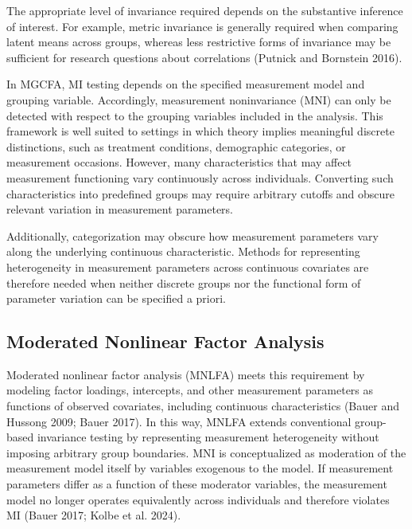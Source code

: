 \documentclass[
  man,
  floatsintext]{apa7}
\begin{document}
The appropriate level of invariance required depends on the substantive
inference of interest. For example, metric invariance is generally
required when comparing latent means across groups, whereas less
restrictive forms of invariance may be sufficient for research questions
about correlations (Putnick and Bornstein 2016).

In MGCFA, MI testing depends on the specified measurement model and
grouping variable. Accordingly, measurement noninvariance (MNI) can only
be detected with respect to the grouping variables included in the
analysis. This framework is well suited to settings in which theory
implies meaningful discrete distinctions, such as treatment conditions,
demographic categories, or measurement occasions. However, many
characteristics that may affect measurement functioning vary
continuously across individuals. Converting such characteristics into
predefined groups may require arbitrary cutoffs and obscure relevant
variation in measurement parameters.

Additionally, categorization may obscure how measurement parameters vary
along the underlying continuous characteristic. Methods for representing
heterogeneity in measurement parameters across continuous covariates are
therefore needed when neither discrete groups nor the functional form of
parameter variation can be specified a priori.

\subsection{Moderated Nonlinear Factor
Analysis}\label{moderated-nonlinear-factor-analysis}

Moderated nonlinear factor analysis (MNLFA) meets this requirement by
modeling factor loadings, intercepts, and other measurement parameters
as functions of observed covariates, including continuous
characteristics (Bauer and Hussong 2009; Bauer 2017). In this way, MNLFA
extends conventional group-based invariance testing by representing
measurement heterogeneity without imposing arbitrary group boundaries.
MNI is conceptualized as moderation of the measurement model itself by
variables exogenous to the model. If measurement parameters differ as a
function of these moderator variables, the measurement model no longer
operates equivalently across individuals and therefore violates MI
(Bauer 2017; Kolbe et al. 2024).
\end{document}
